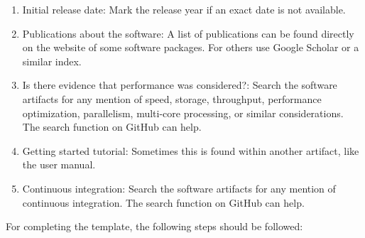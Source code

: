 \documentclass[letterpaper,cleveref]{lipics-v2019}
\theoremstyle{definition}
\begin{document}
\begin{enumerate}
\item Initial release date: Mark the release year if an exact date is not
  available.
\item Publications about the software: A list of publications can be found
  directly on the website of some software packages. For others use Google
  Scholar or a similar index.
\item Is there evidence that performance was considered?: Search the software
  artifacts for any mention of speed, storage, throughput, performance
  optimization, parallelism, multi-core processing, or similar
  considerations. The search function on GitHub can help.
\item Getting started tutorial: Sometimes this is found within another artifact,
  like the user manual.
\item Continuous integration: Search the software artifacts for any mention of
  continuous integration. The search function on GitHub can help.
\end{enumerate}

For completing the template, the following steps should be followed:
\end{document}
